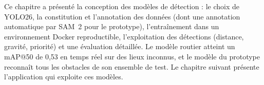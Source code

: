 \chapconclusion
Ce chapitre a présenté la conception des modèles de détection : le choix de YOLO26, la constitution et l'annotation
des données (dont une annotation automatique par SAM~2 pour le prototype), l'entraînement dans un environnement
Docker reproductible, l'exploitation des détections (distance, gravité, priorité) et une évaluation détaillée. Le
modèle routier atteint un mAP@50 de 0,53 en temps réel sur des lieux inconnus, et le modèle du prototype reconnaît
tous les obstacles de son ensemble de test. Le chapitre suivant présente l'application qui exploite ces modèles.
